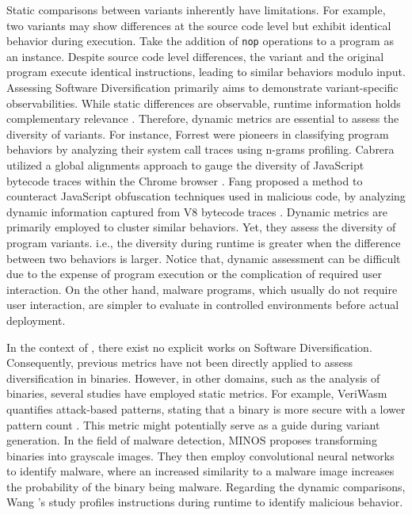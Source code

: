 \begin{strategy}
    \label{trace_based}
    Static comparisons between variants inherently have limitations. 
    For example, two variants may show differences at the source code level but exhibit identical behavior during execution. 
    Take the addition of \texttt{nop} operations to a program as an instance. 
    Despite source code level differences, the variant and the original program execute identical instructions, leading to similar behaviors modulo input. 
    Assessing Software Diversification primarily aims to demonstrate variant-specific observabilities. 
    While static differences are observable, runtime information holds complementary relevance \cite{yao2018anomaly}. 
    Therefore, dynamic metrics are essential to assess the diversity of variants. 
    For instance, Forrest \etal \cite{forrest_system_call} were pioneers in classifying program behaviors by analyzing their system call traces using n-grams profiling. 
    Cabrera \etal utilized a global alignments approach to gauge the diversity of JavaScript bytecode traces within the Chrome browser \cite{STRAC}. 
    Fang \etal proposed a method to counteract JavaScript obfuscation techniques used in malicious code, by analyzing dynamic information captured from V8 bytecode traces \cite{8482113}. 
    Dynamic metrics are primarily employed to cluster similar behaviors.
    Yet, they assess the diversity of program variants. i.e., the diversity during runtime is greater when the difference between two behaviors is larger. 
    Notice that, dynamic assessment can be difficult due to the expense of program execution or the complication of required user interaction. 
    On the other hand, malware programs, which usually do not require user interaction, are simpler to evaluate in controlled environments before actual deployment.

\end{strategy}

In the context of \Wasm, there exist no explicit works on Software Diversification.
Consequently, previous metrics have not been directly applied to assess diversification in \Wasm binaries.
However, in other domains, such as the analysis of \Wasm binaries, several studies have employed static metrics.
For example, VeriWasm quantifies attack-based patterns, stating that a \Wasm binary is more secure with a lower pattern count \cite{veriwasm}.
This metric might potentially serve as a guide during variant generation.
In the field of malware detection, MINOS \cite{MINOS} proposes transforming \Wasm binaries into grayscale images.
They then employ convolutional neural networks to identify malware, where an increased similarity to a malware image increases the probability of the binary being malware.
Regarding the dynamic comparisons, Wang \etal's study \cite{SEISMIC} profiles \Wasm instructions during runtime to identify malicious behavior.


